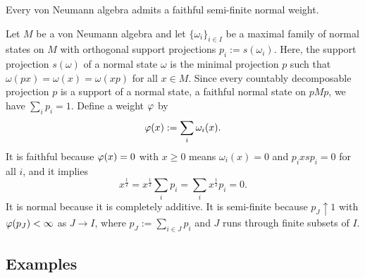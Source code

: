 \documentclass{../../small}
\begin{document}
\begin{prop}
Every von Neumann algebra admits a faithful semi-finite normal weight.
\end{prop}
\begin{pf}
Let $M$ be a von Neumann algebra and let $\{\omega_i\}_{i\in I}$ be a maximal family of normal states on $M$ with orthogonal support projections $p_i:=s(\omega_i)$.
Here, the support projection $s(\omega)$ of a normal state $\omega$ is the minimal projection $p$ such that $\omega(px)=\omega(x)=\omega(xp)$ for all $x\in M$.
Since every countably decomposable projection $p$ is a support of a normal state, a faithful normal state on $pMp$, we have $\sum_ip_i=1$.
Define a weight $\varphi$ by
\[\varphi(x):=\sum_i\omega_i(x).\]
It is faithful because $\varphi(x)=0$ with $x\ge0$ means $\omega_i(x)=0$ and $p_ixsp_i=0$ for all $i$, and it implies
\[x^{\frac12}=x^{\frac12}\sum_ip_i=\sum_ix^{\frac12}p_i=0.\]
It is normal because it is completely additive.
It is semi-finite because $p_J\uparrow1$ with $\varphi(p_J)<\infty$ as $J\to I$, where $p_J:=\sum_{i\in J}p_i$ and $J$ runs through finite subsets of $I$.
\end{pf}



\subsection{Examples}
\end{document}
